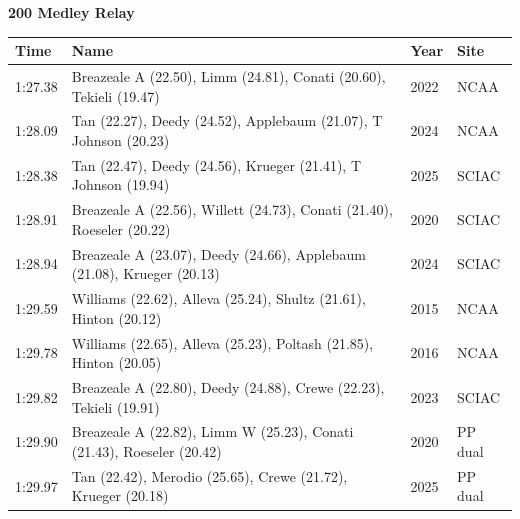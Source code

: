 \noindent\begin{minipage}[t]{0.98\textwidth}
\centering
\textbf{\textcolor{teamprimary}{200 Medley Relay}}\par
\vspace{0.5em}
\centering
\small
\renewcommand{\arraystretch}{1.0}
\setlength{\tabcolsep}{4pt}
\begin{tabular}{@{}p{2.7cm}p{4.3cm}p{1.6cm}p{2.7cm}@{}}
\toprule
\textbf{Time} & \textbf{Name} & \textbf{Year} & \textbf{Site} \\
\midrule
1:27.38 & Breazeale A (22.50), Limm (24.81), Conati (20.60), Tekieli (19.47) & 2022 & NCAA \\
1:28.09 & Tan (22.27), Deedy (24.52), Applebaum (21.07), T Johnson (20.23) & 2024 & NCAA \\
1:28.38 & Tan (22.47), Deedy (24.56), Krueger (21.41), T Johnson (19.94) & 2025 & SCIAC \\
1:28.91 & Breazeale A (22.56), Willett (24.73), Conati (21.40), Roeseler (20.22) & 2020 & SCIAC \\
1:28.94 & Breazeale A (23.07), Deedy (24.66), Applebaum (21.08), Krueger (20.13) & 2024 & SCIAC \\
1:29.59 & Williams (22.62), Alleva (25.24), Shultz (21.61), Hinton (20.12) & 2015 & NCAA \\
1:29.78 & Williams (22.65), Alleva (25.23), Poltash (21.85), Hinton (20.05) & 2016 & NCAA \\
1:29.82 & Breazeale A (22.80), Deedy (24.88), Crewe (22.23), Tekieli (19.91) & 2023 & SCIAC \\
1:29.90 & Breazeale A (22.82), Limm W (25.23), Conati (21.43), Roeseler (20.42) & 2020 & PP dual \\
1:29.97 & Tan (22.42), Merodio (25.65), Crewe (21.72), Krueger (20.18) & 2025 & PP dual \\
\bottomrule
\end{tabular}
\end{minipage}
\vspace{1.2em}

